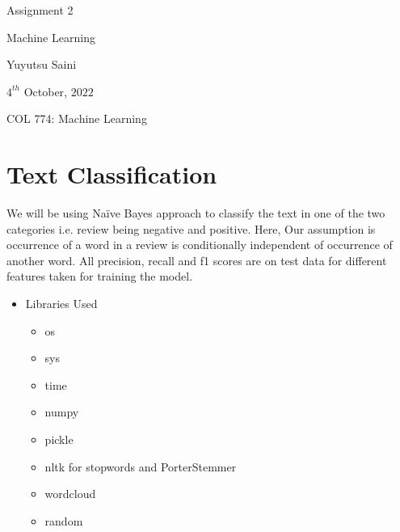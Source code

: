 \documentclass[11pt]{article}
\newcommand\titleofdoc{Assignment 2}
\newcommand\GroupName{Machine Learning}
\begin{document}
\begin{center}
        \vspace*{2cm} %

        \Huge{\titleofdoc} 
            
        \vspace{2 cm}
        \Large{\GroupName}
       
        \vspace{0.25cm}
        \large{Yuyutsu Saini}
       
        \vspace{3 cm}
        \Large{$4^{th}$ October, $2022$}
        
        \vspace{0.25 cm}
        \Large{COL 774: Machine Learning}
\end{center}
\vspace{1cm}
\tableofcontents

\section{Text Classification}

We will be using Na\"{i}ve Bayes approach to classify the text in one of the two categories i.e. review being negative and positive. Here, Our assumption is occurrence of a word in a review is conditionally independent of occurrence of another word. All precision, recall and f1 scores are on test data for different features taken for training the model.

\renewcommand{\labelitemii}{$\$}


\begin{itemize}
    \item \large Libraries Used
    \begin{itemize}
        \item[\ding{227}] os
        \item[\ding{227}] sys
        \item[\ding{227}] time
        \item[\ding{227}] numpy
        \item[\ding{227}] pickle
        \item[\ding{227}] nltk for stopwords and PorterStemmer
        \item[\ding{227}] wordcloud
        \item[\ding{227}] random
    \end{itemize}
\end{itemize}
\end{document}
